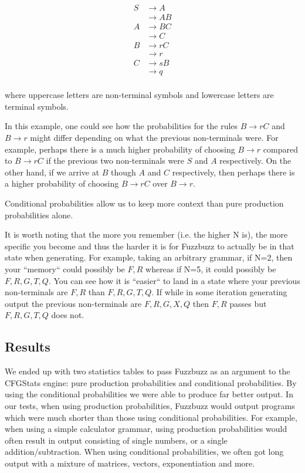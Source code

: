 \begin{align*}
S &\rightarrow A \\
&\rightarrow A B \\
A &\rightarrow B C \\
&\rightarrow C \\
B &\rightarrow r C \\
&\rightarrow r \\
C &\rightarrow s B \\
&\rightarrow q \\
\end{align*}

\noindent
where uppercase letters are non-terminal symbols and lowercase letters are
terminal symbols.


In this example, one could see how the probabilities for the rules $B
\rightarrow rC$ and $B \rightarrow r$ might differ depending on what the
previous non-terminals were. For example, perhaps there is a much higher
probability of choosing $B \rightarrow r$ compared to $B \rightarrow rC$ if the
previous two non-terminals were $S$ and $A$ respectively. On the other hand, if
we arrive at $B$ though $A$ and $C$ respectively, then perhaps there is a
higher probability of choosing $B \rightarrow rC$ over $B \rightarrow r$.

Conditional probabilities allow us to keep more context than pure production
probabilities alone.

It is worth noting that the more you remember (i.e. the higher N is), the more
specific you become and thus the harder it is for Fuzzbuzz to actually be in
that state when generating. For example, taking an arbitrary grammar, if N=2,
then your ``memory`` could possibly be $F, R$ whereas if N=5, it could possibly
be $F, R, G, T, Q$. You can see how it is ``easier`` to land in a state where
your previous non-terminals are $F, R$ than $F, R, G, T, Q$. If while in some
iteration generating output the previous non-terminals are $F, R, G, X, Q$ then
$F, R$ passes but $F, R, G, T, Q$ does not.

\subsection{Results}

We ended up with two statistics tables to pass Fuzzbuzz as an argument to the
CFGStats engine: pure production probabilities and conditional probabilities.
By using the conditional probabilities we were able to produce far better
output. In our tests, when using production probabilities, Fuzzbuzz would
output programs which were much shorter than those using conditional
probabilities. For example, when using a simple calculator grammar,
using production probabilities would often result in output consisting of
single numbers, or a single addition/subtraction. When using conditional
probabilities, we often got long output with a mixture of matrices, vectors,
exponentiation and more.


